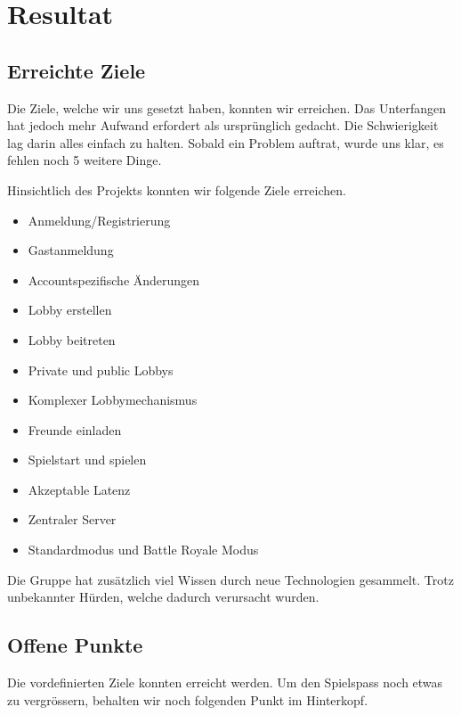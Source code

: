 \documentclass[11pt,ngerman]{article}
\begin{document}


    \section{Resultat}

    \subsection{Erreichte Ziele}
    
    Die Ziele, welche wir uns gesetzt haben, konnten wir erreichen. Das Unterfangen hat jedoch mehr Aufwand erfordert als ursprünglich gedacht. Die Schwierigkeit lag darin alles einfach zu halten. Sobald ein Problem auftrat, wurde uns klar, es fehlen noch 5 weitere Dinge.
    
    Hinsichtlich des Projekts konnten wir folgende Ziele erreichen.
    
	\begin{itemize}
		\item Anmeldung/Registrierung
		\item Gastanmeldung
		\item Accountspezifische Änderungen
		\item Lobby erstellen
		\item Lobby beitreten
		\item Private und public Lobbys
		\item Komplexer Lobbymechanismus
		\item Freunde einladen
		\item Spielstart und spielen
		\item Akzeptable Latenz
		\item Zentraler Server
		\item Standardmodus und Battle Royale Modus
	\end{itemize}

	Die Gruppe hat zusätzlich viel Wissen durch neue Technologien gesammelt. Trotz unbekannter Hürden, welche dadurch verursacht wurden.
	
    \subsection{Offene Punkte}	
    
    Die vordefinierten Ziele konnten erreicht werden. Um den Spielspass noch etwas zu vergrössern, behalten wir noch folgenden Punkt im Hinterkopf.
    
\end{document}
